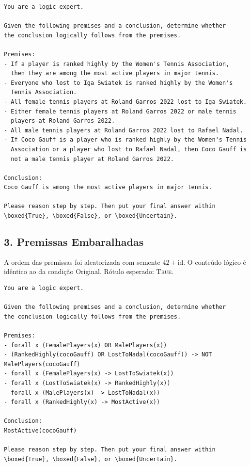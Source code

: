 \begin{lstlisting}[caption={Prompt -- condição Linguagem Natural.},
                   label={lst:prompt-nl}]
You are a logic expert.

Given the following premises and a conclusion, determine whether
the conclusion logically follows from the premises.

Premises:
- If a player is ranked highly by the Women's Tennis Association,
  then they are among the most active players in major tennis.
- Everyone who lost to Iga Swiatek is ranked highly by the Women's
  Tennis Association.
- All female tennis players at Roland Garros 2022 lost to Iga Swiatek.
- Either female tennis players at Roland Garros 2022 or male tennis
  players at Roland Garros 2022.
- All male tennis players at Roland Garros 2022 lost to Rafael Nadal.
- If Coco Gauff is a player who is ranked highly by the Women's Tennis
  Association or a player who lost to Rafael Nadal, then Coco Gauff is
  not a male tennis player at Roland Garros 2022.

Conclusion:
Coco Gauff is among the most active players in major tennis.

Please reason step by step. Then put your final answer within
\boxed{True}, \boxed{False}, or \boxed{Uncertain}.
\end{lstlisting}

\subsection{3. Premissas Embaralhadas}
\label{ap:prompt-shuffled}

A ordem das premissas foi aleatorizada com semente $42 + \text{id}$.
O conteúdo lógico é idêntico ao da condição Original.
Rótulo esperado: \textsc{True}.

\begin{lstlisting}[caption={Prompt -- condição Premissas Embaralhadas.},
                   label={lst:prompt-shuffled}]
You are a logic expert.

Given the following premises and a conclusion, determine whether
the conclusion logically follows from the premises.

Premises:
- forall x (FemalePlayers(x) OR MalePlayers(x))
- (RankedHighly(cocoGauff) OR LostToNadal(cocoGauff)) -> NOT MalePlayers(cocoGauff)
- forall x (FemalePlayers(x) -> LostToSwiatek(x))
- forall x (LostToSwiatek(x) -> RankedHighly(x))
- forall x (MalePlayers(x) -> LostToNadal(x))
- forall x (RankedHighly(x) -> MostActive(x))

Conclusion:
MostActive(cocoGauff)

Please reason step by step. Then put your final answer within
\boxed{True}, \boxed{False}, or \boxed{Uncertain}.
\end{lstlisting}

